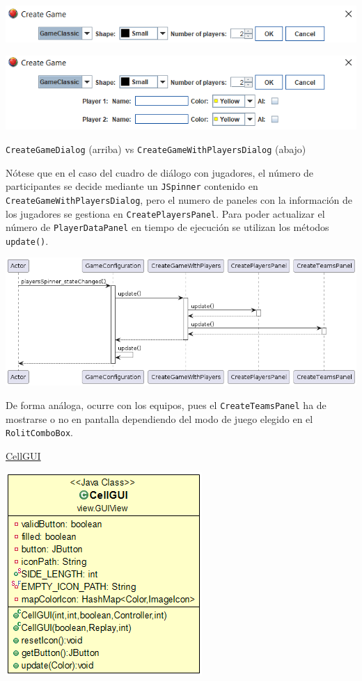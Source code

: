 \documentclass[12pt,a4paper,openright]{book}
\theoremstyle{break}
\begin{document}
\begin{center}
\includegraphics[scale=0.65]{create-game-sprint6.png}
\end{center}

\begin{center}
\includegraphics[scale=0.65]{create-game-players-sprint6.png}

\texttt{CreateGameDialog} (arriba) vs \texttt{CreateGameWithPlayersDialog} (abajo)
\end{center}

Nótese que en el caso del cuadro de diálogo con jugadores, el número de participantes se decide mediante un \texttt{JSpinner} contenido en \texttt{CreateGameWithPlayersDialog}, pero el numero de paneles con la información de los jugadores se gestiona en \texttt{CreatePlayersPanel}. Para poder actualizar el número de \texttt{PlayerDataPanel} en tiempo de ejecución se utilizan los métodos \texttt{update()}.
\begin{center}
\includegraphics[scale=0.41]{updateGameConfig.png}
\end{center}

De forma análoga, ocurre con los equipos, pues el \texttt{CreateTeamsPanel} ha de mostrarse o no en pantalla dependiendo del modo de juego elegido en el \texttt{RolitComboBox}.
\newpage

\underline{CellGUI}
\begin{center}
\includegraphics[scale=0.65]{cellgui.png}
\end{center}
\end{document}
